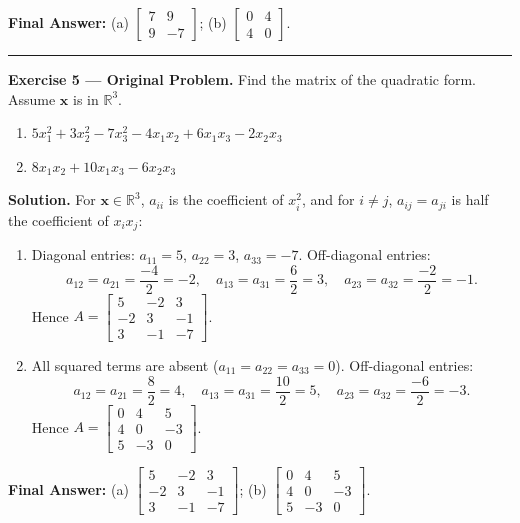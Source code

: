 \documentclass[11pt, letterpaper]{article}
\theoremstyle{definition}
\theoremstyle{remark}
\newcommand{\R}{\mathbb{R}}
\begin{document}
\textbf{Final Answer:} (a) $\begin{bmatrix} 7 & 9 \\ 9 & -7 \end{bmatrix}$; \quad (b) $\begin{bmatrix} 0 & 4 \\ 4 & 0 \end{bmatrix}$.

\medskip
\hrule
\medskip

\textbf{Exercise 5 --- Original Problem.} Find the matrix of the quadratic form. Assume $\mathbf{x}$ is in $\R^3$.
\begin{enumerate}[label=\alph*.]
    \item $5x_1^2 + 3x_2^2 - 7x_3^2 - 4x_1x_2 + 6x_1x_3 - 2x_2x_3$
    \item $8x_1x_2 + 10x_1x_3 - 6x_2x_3$
\end{enumerate}

\textbf{Solution.}
For $\mathbf{x} \in \R^3$, $a_{ii}$ is the coefficient of $x_i^2$, and for $i \neq j$, $a_{ij} = a_{ji}$ is half the coefficient of $x_i x_j$:
\begin{enumerate}[label=\alph*.]
    \item Diagonal entries: $a_{11} = 5$, $a_{22} = 3$, $a_{33} = -7$. Off-diagonal entries:
    \[
    a_{12} = a_{21} = \frac{-4}{2} = -2, \quad a_{13} = a_{31} = \frac{6}{2} = 3, \quad a_{23} = a_{32} = \frac{-2}{2} = -1.
    \]
    Hence $A = \begin{bmatrix} 5 & -2 & 3 \\ -2 & 3 & -1 \\ 3 & -1 & -7 \end{bmatrix}$.
    \item All squared terms are absent ($a_{11} = a_{22} = a_{33} = 0$). Off-diagonal entries:
    \[
    a_{12} = a_{21} = \frac{8}{2} = 4, \quad a_{13} = a_{31} = \frac{10}{2} = 5, \quad a_{23} = a_{32} = \frac{-6}{2} = -3.
    \]
    Hence $A = \begin{bmatrix} 0 & 4 & 5 \\ 4 & 0 & -3 \\ 5 & -3 & 0 \end{bmatrix}$.
\end{enumerate}

\textbf{Final Answer:} (a) $\begin{bmatrix} 5 & -2 & 3 \\ -2 & 3 & -1 \\ 3 & -1 & -7 \end{bmatrix}$; \quad (b) $\begin{bmatrix} 0 & 4 & 5 \\ 4 & 0 & -3 \\ 5 & -3 & 0 \end{bmatrix}$.
\end{document}

